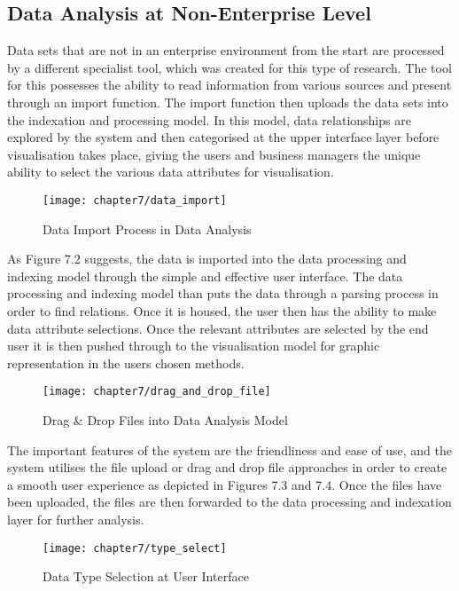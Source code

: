 \subsection{Data Analysis at Non-Enterprise Level}

Data sets that are not in an enterprise environment from the start are processed by a different specialist tool, which was created for this type of research. The tool for this possesses the ability to read information from various sources and present through an import function. The import function then uploads the data sets into the indexation and processing model. In this model, data relationships are explored by the system and then categorised at the upper interface layer before visualisation takes place, giving the users and business managers the unique ability to select the various data attributes for visualisation.
 
\begin{figure}[H]
\centering
\texttt{[image: chapter7/data\_import]}
\caption{Data Import Process in Data Analysis }
\end{figure}

As Figure 7.2 suggests, the data is imported into the data processing and indexing model through the simple and effective user interface. The data processing and indexing model than puts the data through a parsing process in order to find relations. Once it is housed, the user then has the ability to make data attribute selections. Once the relevant attributes are selected by the end user it is then pushed through to the visualisation model for graphic representation in the users chosen methods.

\begin{figure}[H]
\centering
\texttt{[image: chapter7/drag\_and\_drop\_file]}
\caption{Drag & Drop Files into Data Analysis Model }
\end{figure}

The important features of the system are the friendliness and ease of use, and the system utilises the file upload or drag and drop file approaches in order to create a smooth user experience as depicted in Figures 7.3 and 7.4. Once the files have been uploaded, the files are then forwarded to the data processing and indexation layer for further analysis.

\begin{figure}[H]
\centering
\texttt{[image: chapter7/type\_select]}
\caption{Data Type Selection at User Interface }
\end{figure}


